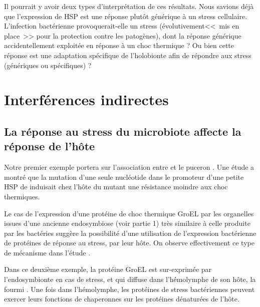 Il pourrait y avoir deux types d'interprétation de ces résultats.
Nous savions déjà que l'expression de HSP est une réponse plutôt générique à un stress cellulaire.
L'infection bactérienne provoquerait-elle un stress (évolutivement<<~mis en place~>> pour la protection contre les patogènes), dont la réponse générique accidentellement exploitée en réponse à un choc thermique ?
Ou bien cette réponse est une adaptation spécifique de l'holobionte afin de répondre aux stress (génériques ou spécifiques) ?

	\section{Interférences indirectes} %
	 	\label{sec:indirect}

\subsection{La réponse au stress du microbiote affecte la réponse de l'hôte} %
\label{sub:groel}


Notre premier exemple portera sur l'association entre  et le
puceron . Une étude \cite{dunbar2007} a montré que la mutation d'une seule nucléotide dans le promoteur d'une petite HSP de  induisait
chez l'hôte du mutant une résistance moindre aux choc thermiques.

Le cas de l'expression d'une protéine de choc thermique GroEL par les
organelles issues d'une ancienne endosymbiose (voir partie
1) très similaire à celle produite par les bactéries
suggère la possibilité d'une utilisation de l'expression bactérienne de
protéines de réponse au stress, par leur hôte. 
On observe effectivement ce type de mécanisme dans l'étude \cite{stoll2009}.


Dans ce deuxième exemple, la protéine GroEL est sur-exprimée par
l'endosymbionte  en cas de stress, et qui diffuse
dans l'hémolymphe de son hôte, la fourmi .
Une fois dans l'hémolymphe, les protéines de stress bactériennes peuvent
exercer leurs fonctions de chaperonnes sur les protéines dénaturées de l'hôte. 




